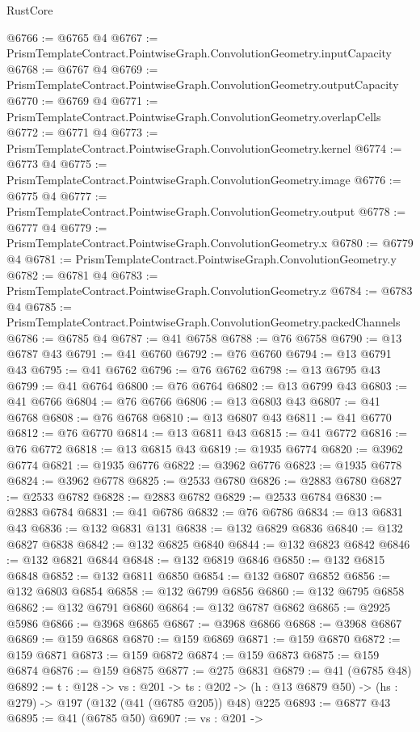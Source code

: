 \begin{lexlean}{RustCore}
\begin{coremodule}
@6766 := @6765 @4
@6767 := PrismTemplateContract.PointwiseGraph.ConvolutionGeometry.inputCapacity
@6768 := @6767 @4
@6769 := PrismTemplateContract.PointwiseGraph.ConvolutionGeometry.outputCapacity
@6770 := @6769 @4
@6771 := PrismTemplateContract.PointwiseGraph.ConvolutionGeometry.overlapCells
@6772 := @6771 @4
@6773 := PrismTemplateContract.PointwiseGraph.ConvolutionGeometry.kernel
@6774 := @6773 @4
@6775 := PrismTemplateContract.PointwiseGraph.ConvolutionGeometry.image
@6776 := @6775 @4
@6777 := PrismTemplateContract.PointwiseGraph.ConvolutionGeometry.output
@6778 := @6777 @4
@6779 := PrismTemplateContract.PointwiseGraph.ConvolutionGeometry.x
@6780 := @6779 @4
@6781 := PrismTemplateContract.PointwiseGraph.ConvolutionGeometry.y
@6782 := @6781 @4
@6783 := PrismTemplateContract.PointwiseGraph.ConvolutionGeometry.z
@6784 := @6783 @4
@6785 := PrismTemplateContract.PointwiseGraph.ConvolutionGeometry.packedChannels
@6786 := @6785 @4
@6787 := @41 @6758
@6788 := @76 @6758
@6790 := @13 @6787 @43
@6791 := @41 @6760
@6792 := @76 @6760
@6794 := @13 @6791 @43
@6795 := @41 @6762
@6796 := @76 @6762
@6798 := @13 @6795 @43
@6799 := @41 @6764
@6800 := @76 @6764
@6802 := @13 @6799 @43
@6803 := @41 @6766
@6804 := @76 @6766
@6806 := @13 @6803 @43
@6807 := @41 @6768
@6808 := @76 @6768
@6810 := @13 @6807 @43
@6811 := @41 @6770
@6812 := @76 @6770
@6814 := @13 @6811 @43
@6815 := @41 @6772
@6816 := @76 @6772
@6818 := @13 @6815 @43
@6819 := @1935 @6774
@6820 := @3962 @6774
@6821 := @1935 @6776
@6822 := @3962 @6776
@6823 := @1935 @6778
@6824 := @3962 @6778
@6825 := @2533 @6780
@6826 := @2883 @6780
@6827 := @2533 @6782
@6828 := @2883 @6782
@6829 := @2533 @6784
@6830 := @2883 @6784
@6831 := @41 @6786
@6832 := @76 @6786
@6834 := @13 @6831 @43
@6836 := @132 @6831 @131
@6838 := @132 @6829 @6836
@6840 := @132 @6827 @6838
@6842 := @132 @6825 @6840
@6844 := @132 @6823 @6842
@6846 := @132 @6821 @6844
@6848 := @132 @6819 @6846
@6850 := @132 @6815 @6848
@6852 := @132 @6811 @6850
@6854 := @132 @6807 @6852
@6856 := @132 @6803 @6854
@6858 := @132 @6799 @6856
@6860 := @132 @6795 @6858
@6862 := @132 @6791 @6860
@6864 := @132 @6787 @6862
@6865 := @2925 @5986
@6866 := @3968 @6865
@6867 := @3968 @6866
@6868 := @3968 @6867
@6869 := @159 @6868
@6870 := @159 @6869
@6871 := @159 @6870
@6872 := @159 @6871
@6873 := @159 @6872
@6874 := @159 @6873
@6875 := @159 @6874
@6876 := @159 @6875
@6877 := @275 @6831
@6879 := @41 (@6785 @48)
@6892 := {t : @128} ->
  {vs : @201} ->
  {ts : @202} -> (h : @13 @6879 @50) -> (hs : @279) -> @197 (@132 (@41 (@6785 @205)) @48) @225
@6893 := @6877 @43
@6895 := @41 (@6785 @50)
@6907 := {vs : @201} ->

\end{coremodule}
\end{lexlean}
